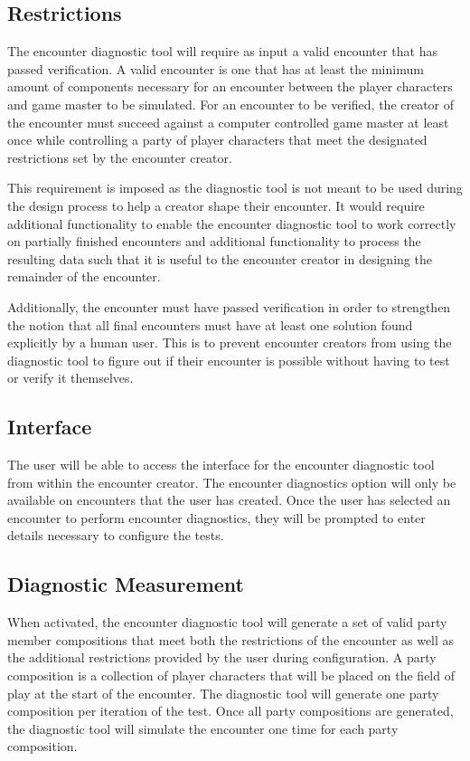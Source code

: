\documentclass[12pt,a4paper]{report}
\begin{document}
		\subsection{Restrictions}
		The encounter diagnostic tool will require as input a valid encounter that has passed verification. A valid encounter is one that has at least the minimum amount of components necessary for an encounter between the player characters and game master to be simulated. For an encounter to be verified, the creator of the encounter must succeed against a computer controlled game master at least once while controlling a party of player characters that meet the designated restrictions set by the encounter creator.  
		
		This requirement is imposed as the diagnostic tool is not meant to be used during the design process to help a creator shape their encounter. It would require additional functionality to enable the encounter diagnostic tool to work correctly on partially finished encounters and additional functionality to process the resulting data such that it is useful to the encounter creator in designing the remainder of the encounter. 
		
		Additionally, the encounter must have passed verification in order to strengthen the notion that all final encounters must have at least one solution found explicitly by a human user. This is to prevent encounter creators from using the diagnostic tool to figure out if their encounter is possible without having to test or verify it themselves. 
		\subsection{Interface}
		The user will be able to access the interface for the encounter diagnostic tool from within the encounter creator. The encounter diagnostics option will only be available on encounters that the user has created. Once the user has selected an encounter to perform encounter diagnostics, they will be prompted to enter details necessary to configure the tests. 
		
		\subsection{Diagnostic Measurement}
		When activated, the encounter diagnostic tool will generate a set of valid party member compositions that meet both the restrictions of the encounter as well as the additional restrictions provided by the user during configuration. A party composition is a collection of player characters that will be placed on the field of play at the start of the encounter. The diagnostic tool will generate one party composition per iteration of the test. Once all party compositions are generated, the diagnostic tool will simulate the encounter one time for each party composition. 
		
\end{document}

